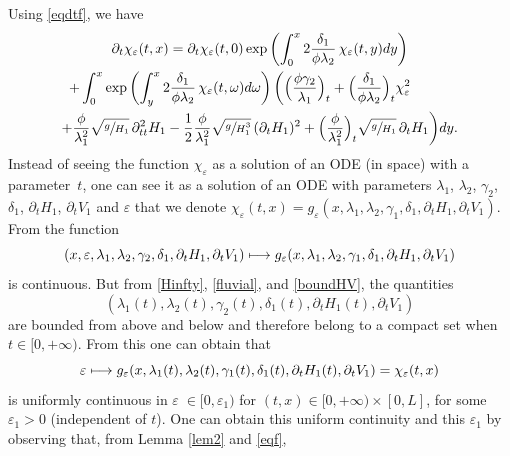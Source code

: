 \documentclass[JEP,XML,SOM,Unicode]{cedram}
\newcommand\mto{\mathchoice{\longmapsto}{\mapsto}{\mapsto}{\mapsto}}
\theoremstyle{definition}
\begin{document}
Using \eqref{eqdtf}, we have
\begin{multline}
\label{difffeps}
\partial_{t}\chi_{\varepsilon}(t,x)=\partial_{t}\chi_{\varepsilon}(t,0)\exp\left(\int_{0}^{x}2\frac{\delta_{1}}{\phi\lambda_{2}}\,\chi_{\varepsilon}(t,y) dy\right)\\
\hspace*{-1cm}+\int_{0}^{x}\exp\left(\int_{y}^{x}2\frac{\delta_{1}}{\phi\lambda_{2}}\,\chi_{\varepsilon}(t,\omega) d\omega\right)\biggl(\Bigl(\frac{\phi\gamma_{2}}{\lambda_{1}}\Bigr)_{t}+\Bigl(\frac{\delta_{1}}{\phi\lambda_{2}}\Bigr)_{t}\chi^{2}_{\varepsilon}\\
+{\frac{\phi}{{\lambda_{1}^{2}}}}\sqrt{\sfrac{g}{H_{1}}}\,\partial_{tt}^{2} H_{1}-\frac{1}{2}{\frac{\phi}{{\lambda_{1}^{2}}}}\sqrt{\sfrac{g}{H_{1}^{3}}}\,(\partial_{t}H_{1})^{2}+{\Bigl(\frac{\phi}{\lambda_{1}^{2}}\Bigr)_{t}\sqrt{\sfrac{g}{H_{1}}}\,\partial_{t} H_{1}} \biggr)dy.
\end{multline}
Instead of seeing the function $\chi_{\varepsilon}$ as a solution of an ODE {(in space)} with a parameter~$t$, one can see it as a solution of an ODE with parameters
$\lambda_{1}$, $\lambda_{2}$, $\gamma_{2}$, $\delta_{1}$, $\partial_{t}H_{1}${, $\partial_{t}V_{1}$} and $\varepsilon$ that we denote ${\chi_{\varepsilon}(t,x) =} g_{\varepsilon}(x,\lambda_{1},\lambda_{2},\gamma_{1},\delta_{1},\partial_{t}H_{1}, {\partial_{t}V_{1}})$. From \cite[Th.\,2.1]{Hartman} the function
\begin{equation*}
(x,\varepsilon, \lambda_{1}, \lambda_{2}, \gamma_{2}, \delta_{1}, \partial_{t}H_{1}, {\partial_{t}V_{1}})\mto g_{\varepsilon}(x,\lambda_{1},\lambda_{2},\gamma_{1},\delta_{1},\partial_{t}H_{1}, {\partial_{t}V_{1}})
\end{equation*}
is continuous. But from \eqref{Hinfty}, \eqref{fluvial}, and \eqref{boundHV}, the quantities
\[
(\lambda_{1}(t), \lambda_{2}(t), \gamma_{2}(t), \delta_{1}(t), \partial_{t}H_{1}(t), {\partial_{t}V_{1}})
\]
are bounded from above and below and therefore belong to a compact set when $t\in[0,+\infty)$.
From this one can obtain that
\begin{equation}
\label{uniformconteps}
\varepsilon\mto g_{\varepsilon}(x,\lambda_{1}(t),\lambda_{2}(t),\gamma_{1}(t),\delta_{1}(t),\partial_{t}H_{1}(t), {\partial_{t}V_{1}})=\chi_{\varepsilon}(t,x)
\end{equation}
is uniformly continuous in $\varepsilon \;{\in [0,\varepsilon_{1})}$ for $(t,x)\in[0,{+}\infty)\times[0,L]$, for some $\varepsilon_{1}>0$ (independent of $t$). One can obtain this uniform continuity and this $\varepsilon_{1}$ by observing that, from Lemma \ref{lem2} and \eqref{eqf},
\end{document}
